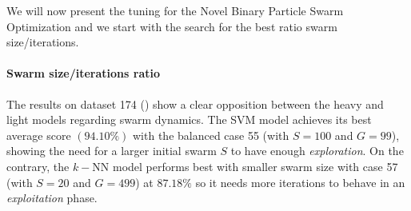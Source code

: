 \documentclass[12pt, openany]{article}
\begin{document}
We will now present the tuning for the Novel Binary Particle Swarm Optimization and we start with the search for the best ratio swarm size/iterations.

\paragraph{Swarm size/iterations ratio} The results on dataset 174 () show a clear opposition between the heavy and light models regarding swarm dynamics. The SVM model achieves its best average score $(94.10\%)$ with the balanced case 55 (with $S=100$ and $G=99$), showing the need for a larger initial swarm $S$ to have enough \emph{exploration}. On the contrary, the $k-$NN model performs best with smaller swarm size with case 57 (with $S=20$ and $G=499$) at $87.18\%$ so it needs more iterations to behave in an \emph{exploitation} phase.
\end{document}
